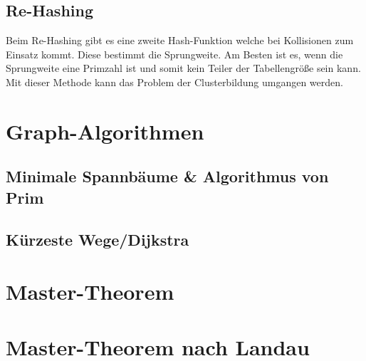 \documentclass[12pt,a4paper]{article}
\begin{document}
\subsection{Re-Hashing}
Beim Re-Hashing gibt es eine zweite Hash-Funktion welche bei Kollisionen zum Einsatz kommt. Diese bestimmt die Sprungweite. Am Besten ist es, wenn die Sprungweite eine Primzahl ist und somit kein Teiler der Tabellengröße sein kann. Mit dieser Methode kann das Problem der Clusterbildung umgangen werden.

\section{Graph-Algorithmen}
\subsection{Minimale Spannbäume \& Algorithmus von Prim}


\subsection{Kürzeste Wege/Dijkstra}


\section{Master-Theorem}


\section{Master-Theorem nach Landau}
\label{sec:MasterLandau}
\end{document}
